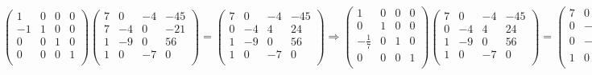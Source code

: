 \documentclass[11pt, a4paper]{article}
\newif\IfInSansMode
\theoremstyle{theorem-style}
\theoremstyle{definition-style}
\theoremstyle{remark-style}
\theoremstyle{example-style}
\begin{document}
$\begin{pmatrix}
1 & 0 & 0 & 0\\
-1 & 1 & 0 & 0\\
0 & 0 & 1 & 0\\
0 & 0 & 0 & 1 \\
\end{pmatrix}
\begin{pmatrix}
7 & 0 & -4 & -45 \\
7 & -4 & 0 & -21 \\
1 & -9 & 0 & 56 \\
1 & 0 & -7 & 0 \\
\end{pmatrix} = 
\begin{pmatrix}
7 & 0 & -4 & -45 \\
0 & -4 & 4 & 24 \\
1 & -9 & 0 & 56 \\
1 & 0 & -7 & 0 \\
\end{pmatrix} \Longrightarrow
\begin{pmatrix}
1 & 0 & 0 & 0\\
0 & 1 & 0 & 0\\
-\frac{1}{7} & 0 & 1 & 0\\
0 & 0 & 0 & 1 \\
\end{pmatrix}
\begin{pmatrix}
7 & 0 & -4 & -45 \\
0 & -4 & 4 & 24 \\
1 & -9 & 0 & 56 \\
1 & 0 & -7 & 0 \\
\end{pmatrix} = 
\begin{pmatrix}
7 & 0 & -4 & -45 \\
0 & -4 & 4 & 24 \\
0 & -9 & \frac{4}{7} & \frac{437}{7} \\
1 & 0 & -7 & 0 \\
\end{pmatrix} \Longrightarrow
\begin{pmatrix}
	1 & 0 & 0 & 0\\
	0 & 1 & 0 & 0\\
	0 & 0 & 1 & 0\\
	-\frac{1}{7} & 0 & 0 & 1 \\
\end{pmatrix}
\begin{pmatrix}
	7 & 0 & -4 & -45 \\
	0 & -4 & 4 & 24 \\
	0 & -9 & \frac{4}{7} & \frac{437}{7} \\
	1 & 0 & -7 & 0 \\
\end{pmatrix} = 
\begin{pmatrix}
	7 & 0 & -4 & -45 \\
	0 & -4 & 4 & 24 \\
	0 & -9 & \frac{4}{7} & \frac{437}{7} \\
	0 & 0 & -\frac{45}{7} & \frac{45}{7} \\
\end{pmatrix}$ \\
\end{document}
